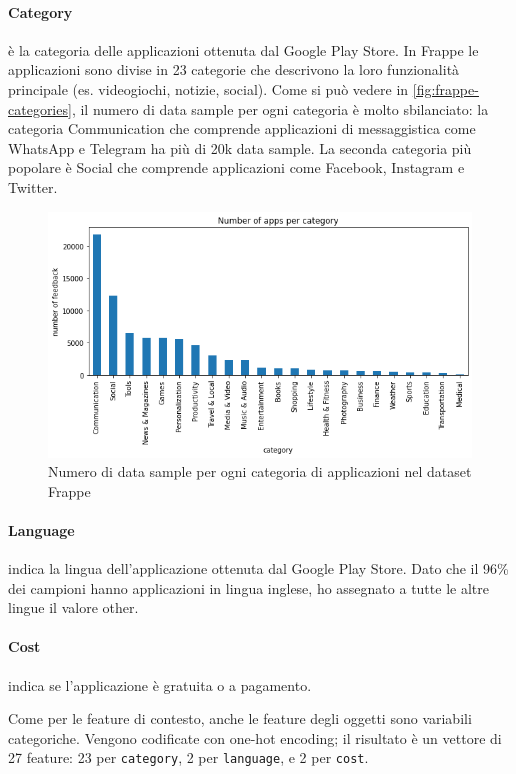 \documentclass[12pt,italian]{report}
\begin{document}
\paragraph{Category} è la categoria delle applicazioni ottenuta dal Google Play Store. In Frappe le applicazioni sono divise in 23 categorie che descrivono la loro funzionalità principale (es. videogiochi, notizie, social). Come si può vedere in \autoref{fig:frappe-categories}, il numero di data sample per ogni categoria è molto sbilanciato: la categoria Communication che comprende applicazioni di messaggistica come WhatsApp e Telegram ha più di 20k data sample. La seconda categoria più popolare è Social che comprende applicazioni come Facebook, Instagram e Twitter.
\begin{figure}
  \centering
  \includegraphics[width=\linewidth]{immagini/frappe-category.png}
  \caption{Numero di data sample per ogni categoria di applicazioni nel dataset Frappe}
  \label{fig:frappe-categories}
\end{figure}

\paragraph{Language} indica la lingua dell'applicazione ottenuta dal Google Play Store. Dato che il 96\% dei campioni hanno applicazioni in lingua inglese, ho assegnato a tutte le altre lingue il valore other.

\paragraph{Cost} indica se l'applicazione è gratuita o a pagamento.

\bigskip \noindent
Come per le feature di contesto, anche le feature degli oggetti sono variabili categoriche. Vengono codificate con one-hot encoding; il risultato è un vettore di 27 feature: 23 per \texttt{category}, 2 per \texttt{language}, e 2 per \texttt{cost}.
\end{document}
